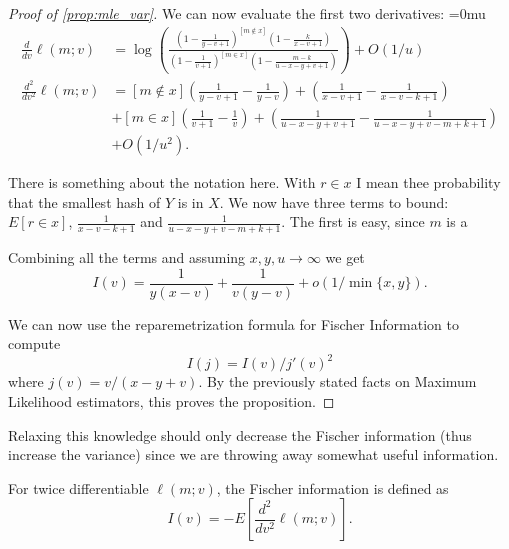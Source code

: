 \begin{proof}[Proof of \cref{prop:mle_var}]
   We can now evaluate the first two derivatives:
   {
      \thinmuskip=0mu
   \begin{align}
      \frac{d}{dv}\ell(m;v)&=
   \log\left(\frac{(1-\frac1{y-v+1})^{[m\not\in x]}(1-\frac{k}{x-v+1})}{(1-\frac 1{v+1})^{[m\in x]}(1-\frac{m-k}{u-x-y+v+1})}\right) + O(1/u)
      \label{eq:deriv1}
      \\
      \frac{d^2}{dv^2}\ell(m;v)&=
       [m\not\in x](\tfrac1{y-v+1}-\tfrac1{y-v})
      + (\tfrac1{x-v+1}-\tfrac1{x-v-k+1})
                               \\&
                               +[m\in x](\tfrac1{v+1}-\tfrac1{v})
      + (\tfrac1{u-x-y+v+1}-\tfrac1{u-x-y+v-m+k+1}) \\&+ O(1/u^2)
      \label{eq:deriv2}
      .
   \end{align}
   }

   There is something about the notation here.
   With $r\in x$ I mean thee probability that the smallest hash of $Y$ is in $X$.
   We now have three terms to bound:
   $E[r \in x]$, $\tfrac1{x-v-k+1}$ and $\tfrac1{u-x-y+v-m+k+1}$.
   The first is easy, since $m$ is a 

   Combining all the terms and assuming $x,y,u\to\infty$ we get
   \[
   I(v)
   = \frac{1}{y(x-v)} + \frac1{v(y-v)} + o(1/\min\{x,y\}).
   \]


   We can now use the reparemetrization formula for Fischer Information to compute
   \[
      I(j) = I(v)/j'(v)^2
   \]
   where $j(v) = v/(x-y+v)$.
   By the previously stated facts on Maximum Likelihood estimators, this proves the proposition.
\end{proof}


Relaxing this knowledge should only decrease the Fischer information (thus increase the variance) since we are throwing away somewhat useful information.

For twice differentiable $\ell(m;v)$,
the Fischer information is defined as
\[
   I(v) = -E[\frac{d^2}{dv^2}\ell(m;v)].
\]





